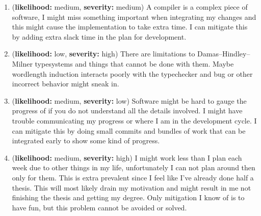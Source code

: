 \documentclass[msc,lith,english]{liuthesis}
\begin{document}
\newcommand{\riskHeader}[2]{(\textbf{likelihood:} #1, \textbf{severity:} #2)}
\begin{enumerate}
  \item \riskHeader{medium}{medium} A compiler is a complex piece of software, I might miss something important when integrating my changes and this might cause the implementation to take extra time. I can mitigate this by adding extra slack time in the plan for development.

  \item \riskHeader{low}{high} There are limitations to Damas–Hindley–Milner typesystems and things that cannot be done with them. Maybe wordlength induction interacts poorly with the typechecker and bug or other incorrect behavior might sneak in.

  \item \riskHeader{medium}{low} Software might be hard to gauge the progress of if you do not understand all the details involved. I might have trouble communicating my progress or where I am in the development cycle. I can mitigate this by doing small commits and bundles of work that can be integrated early to show some kind of progress.

  \item \riskHeader{medium}{high} I might work less than I plan each week due to other things in my life, unfortunately I can not plan around then only for them. This is extra prevalent since I feel like I've already done half a thesis. This will most likely drain my motivation and might result in me not finishing the thesis and getting my degree. Only mitigation I know of is to have fun, but this problem cannot be avoided or solved.

\end{enumerate}

\printbibliography

\todos
\end{document}
